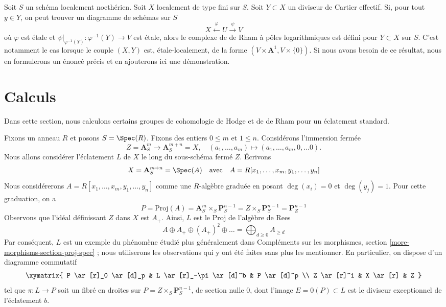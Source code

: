 \begin{remark}
\label{remark-check-log-completion-2}
Soit $S$ un schéma localement noethérien. Soit $X$ localement de type
fini sur $S$. Soit $Y \subset X$ un diviseur de Cartier effectif.
Si, pour tout $y \in Y$, on peut trouver un diagramme de schémas sur $S$
$$
X \xleftarrow{\varphi} U \xrightarrow{\psi} V
$$
où $\varphi$ est étale et $\psi|_{\varphi^{-1}(Y)} : \varphi^{-1}(Y) \to V$
est étale, alors le complexe de de Rham à pôles logarithmiques est défini pour
$Y \subset X$ sur $S$. C'est notamment le cas lorsque le couple $(X, Y)$
est, étale-localement, de la forme $(V \times \mathbf{A}^1, V \times \{0\})$.
Si nous avons besoin de ce résultat, nous en formulerons
un énoncé précis et en ajouterons ici une démonstration.
\end{remark}

















\section{Calculs}
\label{section-calculations}

\noindent
Dans cette section, nous calculons certains groupes de cohomologie de Hodge
et de de Rham pour un éclatement standard.

\medskip\noindent
Fixons un anneau $R$ et posons $S = \Spec(R)$. Fixons des entiers $0 \leq m$ et
$1 \leq n$. Considérons l'immersion fermée
$$
Z = \mathbf{A}^m_S \longrightarrow \mathbf{A}^{m + n}_S = X,\quad
(a_1, \ldots, a_m) \mapsto (a_1, \ldots, a_m, 0, \ldots 0).
$$
Nous allons considérer l'éclatement $L$ de $X$
le long du sous-schéma fermé $Z$. Écrivons
$$
X =
\mathbf{A}^{m + n}_S =
\Spec(A)
\quad\text{avec}\quad
A = R[x_1, \ldots, x_m, y_1, \ldots, y_n]
$$
Nous considérerons $A = R[x_1, \ldots, x_m, y_1, \ldots, y_n]$ comme une
$R$-algèbre graduée en posant $\deg(x_i) = 0$ et $\deg(y_j) = 1$.
Pour cette graduation, on a
$$
P =
\text{Proj}(A) =
\mathbf{A}^m_S \times_S \mathbf{P}^{n - 1}_S =
Z \times_S \mathbf{P}^{n - 1}_S =
\mathbf{P}^{n - 1}_Z
$$
Observons que l'idéal définissant $Z$ dans $X$ est $A_+$.
Ainsi, $L$ est le Proj de l'algèbre de Rees
$$
A \oplus A_+ \oplus (A_+)^2 \oplus \ldots =
\bigoplus\nolimits_{d \geq 0} A_{\geq d}
$$
Par conséquent, $L$ est un exemple du phénomène étudié
plus généralement dans Compléments sur les morphismes, section
\ref{more-morphisms-section-proj-spec} ;
nous utiliserons les observations qui y ont été faites sans plus les mentionner.
En particulier, on dispose d'un diagramme commutatif
$$
\xymatrix{
P \ar[r]_0 \ar[d]_p &
L \ar[r]_-\pi \ar[d]^b &
P \ar[d]^p \\
Z \ar[r]^i &
X \ar[r] &
Z
}
$$
tel que $\pi : L \to P$ soit un fibré en droites sur
$P = Z \times_S \mathbf{P}^{n - 1}_S$,
de section nulle $0$, dont l'image $E = 0(P) \subset L$
est le diviseur exceptionnel de l'éclatement $b$.

